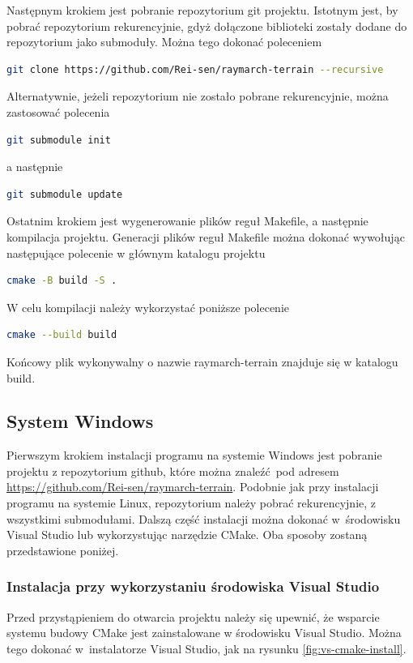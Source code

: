 Następnym krokiem jest pobranie repozytorium git projektu. Istotnym jest, by pobrać repozytorium rekurencyjnie, gdyż dołączone biblioteki zostały dodane do repozytorium jako submoduły. Można tego dokonać poleceniem
\begin{lstlisting}[language=bash]
  git clone https://github.com/Rei-sen/raymarch-terrain --recursive
\end{lstlisting}
Alternatywnie, jeżeli repozytorium nie zostało pobrane rekurencyjnie, można zastosować polecenia
\begin{lstlisting}[language=bash]
  git submodule init
\end{lstlisting}
a następnie
\begin{lstlisting}[language=bash]
  git submodule update
\end{lstlisting}
Ostatnim krokiem jest wygenerowanie plików reguł Makefile, a następnie
kompilacja projektu. Generacji plików reguł Makefile można dokonać wywołując następujące polecenie w głównym katalogu projektu
\begin{lstlisting}[language=bash]
  cmake -B build -S .
\end{lstlisting}
W celu kompilacji należy wykorzystać poniższe polecenie
\begin{lstlisting}[language=bash]
  cmake --build build
\end{lstlisting}
Końcowy plik wykonywalny o nazwie raymarch-terrain znajduje się w katalogu build.
\subsection{System Windows}
Pierwszym krokiem instalacji programu na systemie Windows jest pobranie
projektu z repozytorium github, które można znaleźć pod adresem
\url{https://github.com/Rei-sen/raymarch-terrain}. Podobnie jak przy instalacji programu na systemie Linux, repozytorium należy pobrać rekurencyjnie, z wszystkimi submodułami.
Dalszą część instalacji można dokonać w~środowisku Visual Studio lub
wykorzystując narzędzie CMake. Oba sposoby zostaną przedstawione poniżej.
\subsubsection{Instalacja przy wykorzystaniu środowiska Visual Studio}
Przed przystąpieniem do otwarcia projektu należy się upewnić, że
wsparcie systemu budowy CMake jest zainstalowane w środowisku Visual Studio.
Można tego dokonać w~instalatorze Visual Studio, jak na rysunku \ref{fig:vs-cmake-install}.

